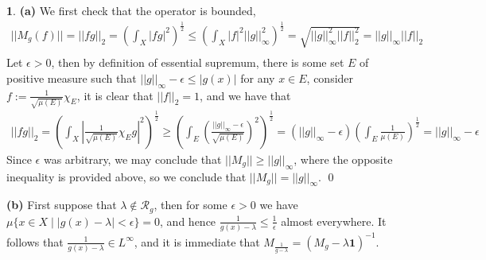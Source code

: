 \documentclass[11pt]{article}
\theoremstyle{definition}
\newtheorem{pb}{}
\newcommand{\set}[1]{\{#1\}}
\newcommand{\abs}[1]{\left\vert#1\right\vert}
\newcommand{\norm}[1]{\lvert\lvert#1\rvert\rvert}
\begin{document}
    \begin{pb}
        \textbf{(a)} We first check that the operator is bounded,
        \begin{align*}
            \norm{M_g(f)} = \norm{fg}_2 = \left(\int_X \abs{fg}^2\right)^{\frac12} \leq \left(\int_X \abs{f}^2\norm{g}^2_\infty\right)^{\frac12} = \sqrt{\norm{g}_\infty^2\norm{f}_2^2} = \norm{g}_\infty\norm{f}_2\\
        \end{align*}
        Let \(\epsilon > 0\), then by definition of essential supremum, there is some set \(E\) of positive measure such that \(\norm{g}_\infty - \epsilon \leq \abs{g(x)}\) for any \(x \in E\), consider \(f := \frac{1}{\sqrt{\mu(E)}}\chi_E\), it is clear that \(\norm{f}_2 = 1\), and we have that
        \begin{align*}
            \norm{fg}_2 = \left(\int_X \abs{\frac{1}{\sqrt{\mu(E)}}\chi_E g}^2\right)^{\frac12} \geq \left(\int_E\left(\frac{\norm{g}_\infty - \epsilon}{\sqrt{\mu(E)}}\right)^2 \right)^{\frac12} = (\norm{g}_\infty - \epsilon)\left(\int_E \frac{1}{\mu(E)}\right)^{\frac12} = \norm{g}_\infty - \epsilon
        \end{align*}
        Since \(\epsilon\) was arbitrary, we may conclude that \(\norm{M_g} \geq \norm{g}_\infty\), where the opposite inequality is provided above, so we conclude that \(\norm{M_g} = \norm{g}_\infty\). \qed

        \textbf{(b)} First suppose that \(\lambda \not \in \mathcal{R}_g\), then for some \(\epsilon > 0\) we have \(\mu\set{x \in X \mid \abs{g(x) - \lambda} < \epsilon} = 0\), and hence \(\frac{1}{g(x) - \lambda} \leq \frac{1}{\epsilon}\) almost everywhere. It follows that \(\frac{1}{g(x) - \lambda} \in L^\infty\), and it is immediate that \(M_{\frac{1}{g-\lambda}} = (M_g - \lambda\mathbf{1})^{-1}\).


\end{pb}
\end{document}
